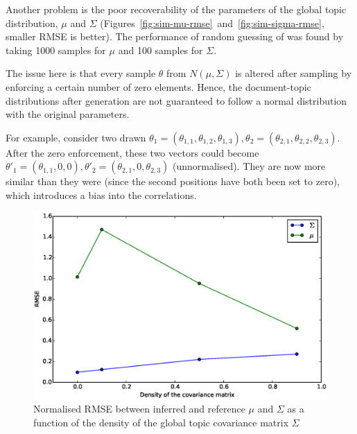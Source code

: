 \documentclass[12pt,a4paper,twoside,openright]{report}
\begin{document}
Another problem is the poor recoverability of the parameters of the global topic distribution, $\mu$ and $\Sigma$ (Figures~\ref{fig:sim-mu-rmse}~and~\ref{fig:sim-sigma-rmse}, smaller RMSE is better). The performance of random guessing of was found by taking 1000 samples for $\mu$ and 100 samples for $\Sigma$.

The issue here is that every sample $\theta$ from $N(\mu, \Sigma)$ is altered after sampling by enforcing a certain number of zero elements. Hence, the document-topic distributions after generation are not guaranteed to follow a normal distribution with the original parameters.

For example, consider two drawn $\theta_1 = (\theta_{1,1}, \theta_{1,2}, \theta_{1,3}), \theta_2 = (\theta_{2,1}, \theta_{2,2}, \theta_{2,3})$. After the zero enforcement, these two vectors could become $\theta'_1 = (\theta_{1,1}, 0, 0), \theta'_2 = (\theta_{2,1}, 0, \theta_{2,3})$ (unnormalised). They are now more similar than they were (since the second positions have both been set to zero), which introduces a bias into the correlations.

\begin{figure}[!htb]
\includegraphics[width=\textwidth]{sim-sigmadensity-musigma.eps}
\caption{Normalised RMSE between inferred and reference $\mu$ and $\Sigma$ as a function of the density of the global topic covariance matrix $\Sigma$}
\label{fig:sim-sigmadensity-musigma}
\end{figure}
\end{document}
